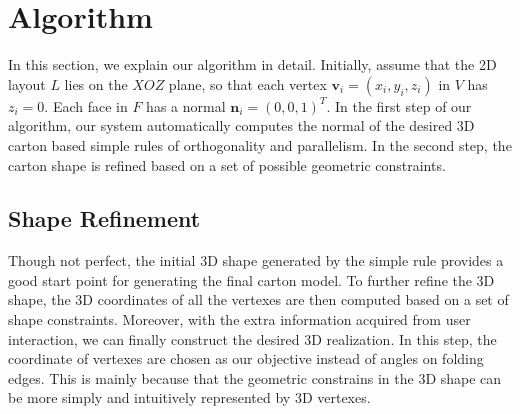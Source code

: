 \section{Algorithm}\label{sec:optimization}


In this section, we explain our algorithm in detail. 
Initially, assume that the 2D layout $L$ lies on the $XOZ$ plane, so that each vertex $\mathbf{v}_i=(x_i,y_i,z_i)$ in $V$ has $z_i=0$. 
Each face in $F$ has a normal $\mathbf{n}_i=(0,0,1)^T$.
%
In the first step of our algorithm, our system automatically computes the normal of the desired 3D carton based simple rules of orthogonality and parallelism.
In the second step, the carton shape is refined based on a set of possible geometric constraints.



\subsection{Shape Refinement}

Though not perfect, the initial 3D shape generated by the simple rule provides a good start point for generating the final carton model. 
%
To further refine the 3D shape, the 3D coordinates of all the vertexes are then computed based on a set of shape constraints.
%
Moreover, with the extra information acquired from user interaction, we can finally construct the desired 3D realization.
In this step, the coordinate of vertexes are chosen as our objective instead of angles on folding edges.
This is mainly because that the geometric constrains in the 3D shape can be more simply and intuitively represented by 3D vertexes.



